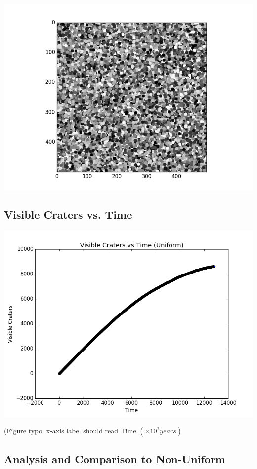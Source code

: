 \documentclass[11pt]{article}
\begin{document}
\includegraphics[scale=.4]{UniformSaturation.png}

\subsection{Visible Craters vs. Time}
\includegraphics[scale=.85]{VisibleCratersvsTimeUniform.png}
\begin{center}
(Figure typo. x-axis label should read Time \( \left( \times 10^3 years \right) \)
\end{center}
\subsection{Analysis and Comparison to Non-Uniform}
\end{document}
